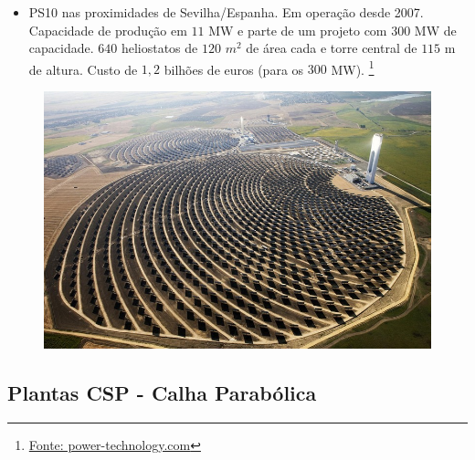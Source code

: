 \documentclass[12pt,notheorems,hyperref={pdfauthor= Rafael Nardi}]{beamer}
\begin{document}
\begin{frame}%

	\begin{itemize} 
		\item PS10 nas proximidades de Sevilha/Espanha. Em operação desde 2007.
			Capacidade de produção em $11$ MW e parte de um projeto com
			$300$ MW de capacidade. $640$ heliostatos de $120$ $m^2$ de área cada e torre central de $115$ m de altura.
			Custo de $1,2$ bilhões de euros (para os $300$ MW). \footnote{\href{https://www.power-technology.com/projects/seville-solar-tower/}{Fonte: power-technology.com}}
	\end{itemize}

	\begin{figure}
		\centering
		\includegraphics[scale=0.3]{./seville-solar-plant-10[6].jpg}
	\end{figure}

\end{frame}

\subsection{Plantas CSP - Calha Parabólica}
\end{document}
